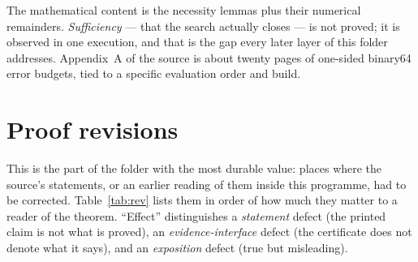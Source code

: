 \documentclass[10pt]{article}
\theoremstyle{definition}
\begin{document}
The mathematical content is the necessity lemmas plus their numerical remainders. \emph{Sufficiency}
--- that the search actually closes --- is not proved; it is observed in one execution, and that is
the gap every later layer of this folder addresses. Appendix~A of the source is about twenty pages of
one-sided binary64 \cite{ieee754} error budgets, tied to a specific evaluation order and build.

\section{Proof revisions}\label{sec:rev}

This is the part of the folder with the most durable value: places where the source's statements,
or an earlier reading of them inside this programme, had to be corrected. Table~\ref{tab:rev} lists
them in order of how much they matter to a reader of the theorem. ``Effect'' distinguishes a
\emph{statement} defect (the printed claim is not what is proved), an \emph{evidence-interface}
defect (the certificate does not denote what it says), and an \emph{exposition} defect (true but
misleading).
\end{document}
